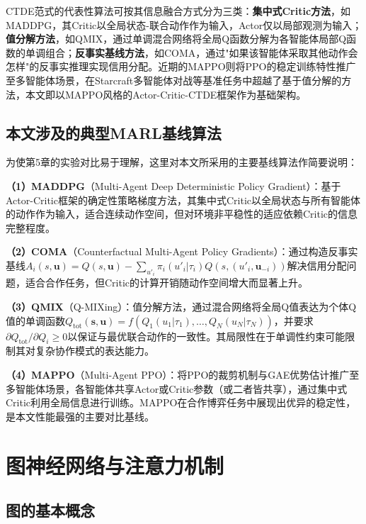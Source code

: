 \documentclass[12pt,a4paper,UTF8]{ctexbook}
\begin{document}
CTDE范式的代表性算法可按其信息融合方式分为三类：\textbf{集中式Critic方法}，如MADDPG\cite{ref34}，其Critic以全局状态-联合动作作为输入，Actor仅以局部观测为输入；\textbf{值分解方法}，如QMIX\cite{ref33}，通过单调混合网络将全局Q函数分解为各智能体局部Q函数的单调组合；\textbf{反事实基线方法}，如COMA\cite{ref35}，通过"如果该智能体采取其他动作会怎样"的反事实推理实现信用分配。近期的MAPPO\cite{ref36}则将PPO的稳定训练特性推广至多智能体场景，在Starcraft多智能体对战等基准任务中超越了基于值分解的方法，本文即以MAPPO风格的Actor-Critic-CTDE框架作为基础架构。

\subsection{本文涉及的典型MARL基线算法}

为使第5章的实验对比易于理解，这里对本文所采用的主要基线算法作简要说明：

\textbf{（1）MADDPG}（Multi-Agent Deep Deterministic Policy Gradient）\cite{ref34}：基于Actor-Critic框架的确定性策略梯度方法，其集中式Critic以全局状态与所有智能体的动作作为输入，适合连续动作空间，但对环境非平稳性的适应依赖Critic的信息完整程度。

\textbf{（2）COMA}（Counterfactual Multi-Agent Policy Gradients）\cite{ref35}：通过构造反事实基线$A_i(s,\bm{u})=Q(s,\bm{u})-\sum_{u'_i}\pi_i(u'_i|\tau_i)Q(s,(u'_i,\bm{u}_{-i}))$解决信用分配问题，适合合作任务，但Critic的计算开销随动作空间增大而显著上升。

\textbf{（3）QMIX}（Q-MIXing）\cite{ref33}：值分解方法，通过混合网络将全局Q值表达为个体Q值的单调函数$Q_{\text{tot}}(\bm{s},\bm{u})=f(Q_1(u_1|\tau_1),\ldots,Q_N(u_N|\tau_N))$，并要求$\partial Q_{\text{tot}}/\partial Q_i\geq0$以保证与最优联合动作的一致性。其局限性在于单调性约束可能限制其对复杂协作模式的表达能力。

\textbf{（4）MAPPO}（Multi-Agent PPO）\cite{ref36}：将PPO的裁剪机制与GAE优势估计推广至多智能体场景，各智能体共享Actor或Critic参数（或二者皆共享），通过集中式Critic利用全局信息进行训练。MAPPO在合作博弈任务中展现出优异的稳定性，是本文性能最强的主要对比基线。

\section{图神经网络与注意力机制}

\subsection{图的基本概念}
\end{document}
